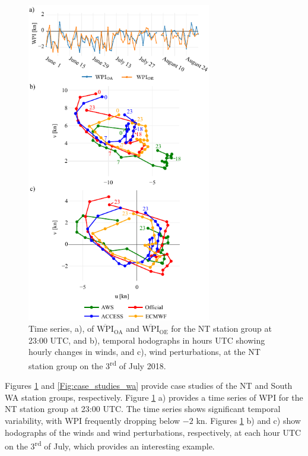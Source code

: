 \documentclass[twocol]{ametsoc}
\begin{document}
\begin{figure}
\centering
\includegraphics[width=19pc]{case_studies_nt.pdf}
\caption{Time series, a), of $\overline{\text{WPI}}_\text{OA}$ and $\overline{\text{WPI}}_\text{OE}$ for the NT station group at 23:00 UTC, and b), temporal hodographs in hours UTC showing hourly changes in winds, and c), wind perturbations, at the NT station group on the 3\textsuperscript{rd} of July 2018.} 
\label{Fig:case_studies_nt}
\end{figure}

Figures \ref{Fig:case_studies_nt} and \ref{Fig:case_studies_wa} provide case studies of the NT and South WA station groups, respectively. Figure \ref{Fig:case_studies_nt} a) provides a time series of WPI for the NT station group at 23:00 UTC. The time series shows significant temporal variability, with WPI frequently dropping below $-2$ kn. Figures \ref{Fig:case_studies_nt} b) and c) show hodographs of the winds and wind perturbations, respectively, at each hour UTC on the 3\textsuperscript{rd} of July, which provides an interesting example. 
\end{document}

